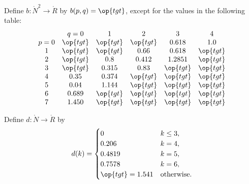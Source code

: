 \begin{definition}[b]
Define $b:\ring{N}^2\to \ring{R}$ by $b(p,q)=\op{tgt}$,
except for the values in the following table:
{
\def\tx{\op{tgt}}
\[ \begin{matrix}  &q=0&1&2&3&4\\
p=0&\tx&\tx&\tx&0.618&1.0\\
1&\tx&\tx&0.66&0.618&\tx\\
2&\tx&0.8&0.412&1.2851&\tx\\
3&\tx&0.315&0.83&\tx&\tx\\
4&0.35&0.374&\tx&\tx&\tx\\
5&0.04&1.144&\tx&\tx&\tx\\
6&0.689&\tx&\tx&\tx&\tx\\
7&1.450&\tx&\tx&\tx&\tx
\end{matrix}
\] 
}
%
\end{definition}


\begin{definition}[d]
Define $d:\ring{N}\to \ring{R}$ by
\[ d(k) = \begin{cases}
0 & k\le3, \\
0.206 & k=4, \\
0.4819 & k=5, \\
0.7578 & k=6, \\
\op{tgt}=1.541 & \text{otherwise}.
\end{cases}
\] 
%
\end{definition}




